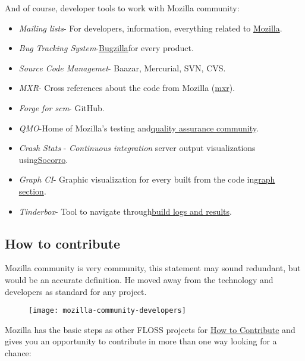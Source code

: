 And of course, developer tools to work with Mozilla community:

\begin{itemize}
	\item \textit{Mailing lists}- For developers, information, everything related to \href{https://lists.mozilla.org/listinfo}{Mozilla}.
	\item \textit{Bug Tracking System}-\href{https://bugzilla.mozilla.org/}{Bugzilla}for every product.
	\item \textit{Source Code Managemet}- Baazar, Mercurial, SVN, CVS.
	\item \textit{MXR}- Cross references about the code from Mozilla (\href{http://mxr.mozilla.org/}{mxr}).
	\item \textit{Forge for scm}- GitHub.
	\item \textit{QMO}-Home of Mozilla's testing and\href{http://quality.mozilla.org/}{quality assurance community}.
	\item \textit{Crash Stats} - \emph{Continuous integration} server output visualizations using\href{https://github.com/mozilla/socorro}{Socorro}.
	\item \textit{Graph CI}- Graphic visualization for every built from the code in\href{http://graphs.mozilla.org/}{graph section}.
	\item \textit{Tinderbox}- Tool to navigate through\href{http://tinderbox.mozilla.org/showbuilds.cgi}{build logs and results}.
\end{itemize}

\subsection{How to contribute}

\par Mozilla community is very community, this statement may sound redundant, but would be an accurate definition. He moved away from the technology and developers as standard for any project.

\begin{figure}[H]
    \centering
    \texttt{[image: mozilla-community-developers]}
    \caption{}
    \label{community-dev}
\end{figure}

\par Mozilla has the basic steps as other FLOSS projects for \href{http://www.mozilla.org/es-ES/contribute/}{How to Contribute} and gives you an opportunity to contribute in more than one way looking for a chance:

